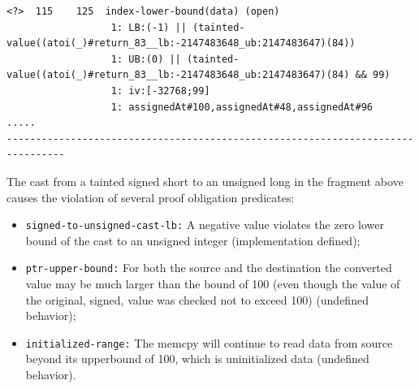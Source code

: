 \documentclass[11pt]{article}
\begin{document}
\begin{tiny}
\begin{verbatim}
<?>  115    125  index-lower-bound(data) (open)
                  1: LB:(-1) || (tainted-value((atoi(_)#return_83__lb:-2147483648_ub:2147483647)(84))
                  1: UB:(0) || (tainted-value((atoi(_)#return_83__lb:-2147483648_ub:2147483647)(84) && 99)
                  1: iv:[-32768;99]
                  1: assignedAt#100,assignedAt#48,assignedAt#96
..... 
--------------------------------------------------------------------------------
\end{verbatim}
\end{tiny}

The cast from a tainted signed short to an unsigned long in the fragment above causes the
violation of several proof obligation predicates: 
\begin{itemize}
\item {\tt signed-to-unsigned-cast-lb:} A negative value violates the zero lower bound of the
cast to an unsigned integer (implementation defined);
\item {\tt ptr-upper-bound:} For both the source and the destination the converted value may be
much larger than the bound of 100 (even though the value of the original, signed, value was
checked not to exceed 100) (undefined behavior);
\item {\tt initialized-range:} The memcpy will continue to read data from source beyond its upperbound
of 100, which is uninitialized data (undefined behavior).
\end{itemize}
\end{document}
